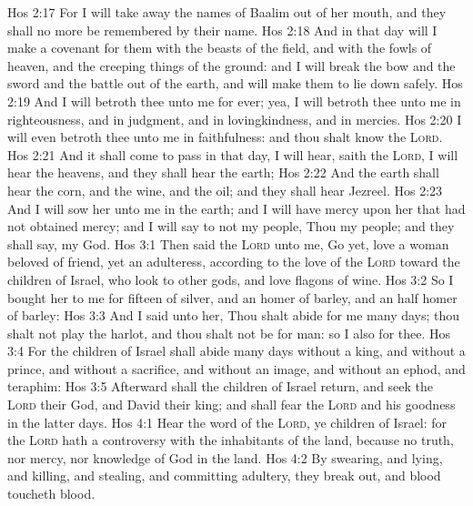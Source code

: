 \vs Hos 2:17 For I will take away the names of Baalim out of her mouth, and they shall no more be remembered by their name.
\vs Hos 2:18 And in that day will I make a covenant for them with the beasts of the field, and with the fowls of heaven, and  the creeping things of the ground: and I will break the bow and the sword and the battle out of the earth, and will make them to lie down safely.
\vs Hos 2:19 And I will betroth thee unto me for ever; yea, I will betroth thee unto me in righteousness, and in judgment, and in lovingkindness, and in mercies.
\vs Hos 2:20 I will even betroth thee unto me in faithfulness: and thou shalt know the \textsc{Lord}.
\vs Hos 2:21 And it shall come to pass in that day, I will hear, saith the \textsc{Lord}, I will hear the heavens, and they shall hear the earth;
\vs Hos 2:22 And the earth shall hear the corn, and the wine, and the oil; and they shall hear Jezreel.
\vs Hos 2:23 And I will sow her unto me in the earth; and I will have mercy upon her that had not obtained mercy; and I will say to  not my people, Thou  my people; and they shall say,  my God.
\vs Hos 3:1 Then said the \textsc{Lord} unto me, Go yet, love a woman beloved of  friend, yet an adulteress, according to the love of the \textsc{Lord} toward the children of Israel, who look to other gods, and love flagons of wine.
\vs Hos 3:2 So I bought her to me for fifteen  of silver, and  an homer of barley, and an half homer of barley:
\vs Hos 3:3 And I said unto her, Thou shalt abide for me many days; thou shalt not play the harlot, and thou shalt not be for  man: so  I also  for thee.
\vs Hos 3:4 For the children of Israel shall abide many days without a king, and without a prince, and without a sacrifice, and without an image, and without an ephod, and  teraphim:
\vs Hos 3:5 Afterward shall the children of Israel return, and seek the \textsc{Lord} their God, and David their king; and shall fear the \textsc{Lord} and his goodness in the latter days.
\vs Hos 4:1 Hear the word of the \textsc{Lord}, ye children of Israel: for the \textsc{Lord} hath a controversy with the inhabitants of the land, because  no truth, nor mercy, nor knowledge of God in the land.
\vs Hos 4:2 By swearing, and lying, and killing, and stealing, and committing adultery, they break out, and blood toucheth blood.
